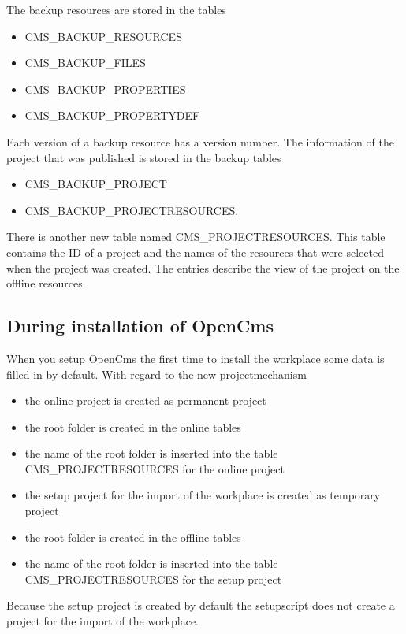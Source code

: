 The backup resources are stored in the tables
\begin{itemize}
\item CMS\_BACKUP\_RESOURCES
\item CMS\_BACKUP\_FILES
\item CMS\_BACKUP\_PROPERTIES
\item CMS\_BACKUP\_PROPERTYDEF
\end{itemize}
Each version of a backup resource has a version number. The
information of the project that was published is stored in the
backup tables

\begin{itemize}
\item CMS\_BACKUP\_PROJECT
\item CMS\_BACKUP\_PROJECTRESOURCES.
\end{itemize}

There is another new table named CMS\_PROJECTRESOURCES. This table
contains the ID of a project and the names of the resources that
were selected when the project was created. The entries describe
the view of the project on the offline resources.

\subsection{During installation of OpenCms}

When you setup OpenCms the first time to install the workplace
some data is filled in by default. With regard to the new
projectmechanism

\begin{itemize}
\item the online project is created as permanent project
\item the root folder is created in the online tables
\item the name of the root folder is inserted into the table CMS\_PROJECTRESOURCES for the online project
\item the setup project for the import of the workplace is created as temporary project
\item the root folder is created in the offline tables
\item the name of the root folder is inserted into the table CMS\_PROJECTRESOURCES for the setup project
\end{itemize}

Because the setup project is created by default the setupscript
does not create a project for the import of the workplace.

